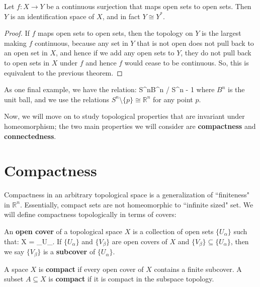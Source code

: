 	\begin{theorem}
		Let $f : X\rightarrow Y$ be a continuous surjection that maps open sets to open sets. Then $Y$ is an identification space of $X$, and in fact $Y\cong 
		Y^*$. 
	\end{theorem}
	
	\begin{proof}
		If $f$ maps open sets to open sets, then the topology on $Y$ is the largest making $f$ continuous, because any set in $Y$ that is not open does 
		not pull back to an open set in $X$, and hence if we add any open sets to $Y$, they do not pull back to open sets in $X$ under $f$ and hence 
		$f$ would cease to be continuous. So, this is equivalent to the previous theorem. 
	\end{proof}
	
	As one final example, we have the relation:
	\eq
		S^n\cong B^n / S^{n - 1}
	\qe
	where $B^n$ is the unit ball, and we use the relations $S^n\setminus\{p\}\cong \mathbb R^n$ for any point $p$.

	Now, we will move on to study topological properties that are invariant under homeomorphism; the two main properties 
	we will consider are \textbf{compactness} and \textbf{connectedness}.

\newpage

\section{Compactness}
	
	Compactness in an arbitrary topological space is a generalization of ``finiteness" in $\mathbb R^n$. Essentially, compact 
	sets are not homeomorphic to ``infinite sized" set. We will define compactness topologically in terms of covers:
	
	\begin{definition}
		An \textbf{open cover} of a topological space $X$ is a collection of open sets $\{U_\alpha\}$ such that:
		\eq
			X = \bigcup_\alpha U_\alpha.
		\qe
		If $\{U_\alpha\}$ and $\{V_\beta\}$ are open covers of $X$ and $\{V_\beta\}\subseteq\{U_\alpha\}$, then we say 
		$\{V_\beta\}$ is a \textbf{subcover} of $\{U_\alpha\}$.
	\end{definition}
	
	\begin{definition}[Compactness]
		A space $X$ is \textbf{compact} if every open cover of $X$ contains a finite subcover. A subset $A\subseteq X$ is 
		\textbf{compact} if it is compact in the subspace topology. 
	\end{definition}
	
